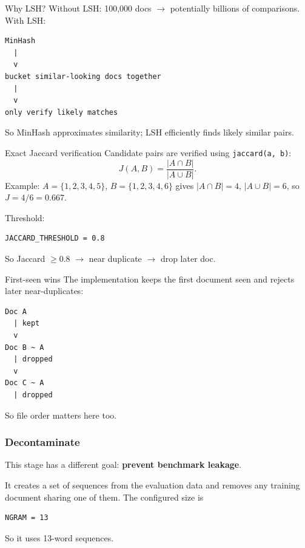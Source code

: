 \begin{paragraphblock}{Why LSH?}
  Without LSH: 100{,}000 docs $\rightarrow$ potentially billions of
  comparisons. With LSH:
\begin{lstlisting}[style=shadedpython,language={},basicstyle=\scriptsize\ttfamily]
MinHash
  |
  v
bucket similar-looking docs together
  |
  v
only verify likely matches
\end{lstlisting}
  So MinHash approximates similarity; LSH efficiently finds likely similar
  pairs.
\end{paragraphblock}

\begin{paragraphblock}{Exact Jaccard verification}
  Candidate pairs are verified using \texttt{jaccard(a, b)}:
  \[
    J(A,B)=\frac{|A \cap B|}{|A \cup B|}.
  \]
  Example: $A=\{1,2,3,4,5\}$, $B=\{1,2,3,4,6\}$ gives
  $|A\cap B|=4$, $|A\cup B|=6$, so $J=4/6=0.667$.

  Threshold:
\begin{lstlisting}[style=shadedpython]
JACCARD_THRESHOLD = 0.8
\end{lstlisting}
  So Jaccard $\ge 0.8$ $\rightarrow$ near duplicate $\rightarrow$ drop later
  doc.
\end{paragraphblock}

\begin{paragraphblock}{First-seen wins}
  The implementation keeps the first document seen and rejects later
  near-duplicates:
\begin{lstlisting}[style=shadedpython,language={},basicstyle=\scriptsize\ttfamily]
Doc A
  | kept
  v
Doc B ~ A
  | dropped
  v
Doc C ~ A
  | dropped
\end{lstlisting}
  So file order matters here too.
\end{paragraphblock}

\subsubsection{Decontaminate}

This stage has a different goal: \textbf{prevent benchmark leakage}.

It creates a set of sequences from the evaluation data and removes any
training document sharing one of them. The configured size is
\begin{lstlisting}[style=shadedpython]
NGRAM = 13
\end{lstlisting}
So it uses 13-word sequences.

